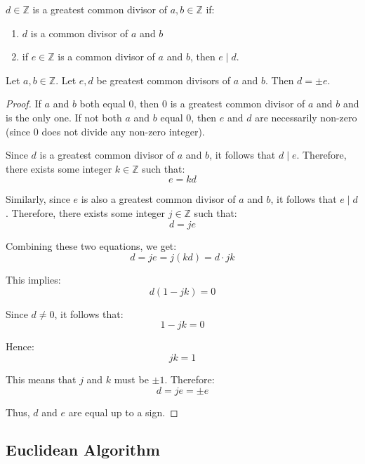 \documentclass[11pt]{article}
\begin{document}
\begin{definition}
    \(d \in \mathbb{Z}\) is a greatest common divisor of \(a, b \in \mathbb{Z}\) if:
    \begin{enumerate}
        \item \(d\) is a common divisor of \(a\) and \(b\)
        \item if \(e \in \mathbb{Z}\) is a common divisor of \(a\) and \(b\), then \(e \mid
              d\).
    \end{enumerate}
\end{definition}
\begin{lemma}
    Let \(a, b \in \mathbb{Z}\). Let \(e, d\) be greatest common divisors of \(a\) and \(b\). Then \(d = \pm e\).
\end{lemma}

\begin{proof}
    If \(a\) and \(b\) both equal \(0\), then \(0\) is a greatest common divisor of \(a\) and \(b\) and is the only one. If not both \(a\) and \(b\) equal \(0\), then \(e\) and \(d\) are necessarily non-zero (since \(0\) does not divide any non-zero integer).

    Since \(d\) is a greatest common divisor of \(a\) and \(b\), it follows that
    \(d \mid e\). Therefore, there exists some integer \(k \in \mathbb{Z}\) such
    that:
    \[ e = kd \]

    Similarly, since \(e\) is also a greatest common divisor of \(a\) and \(b\), it
    follows that \(e \mid d\). Therefore, there exists some integer \(j \in
    \mathbb{Z}\) such that:
    \[ d = je \]

    Combining these two equations, we get:
    \[ d = je = j(kd) = d \cdot jk \]

    This implies:
    \[ d(1 - jk) = 0 \]

    Since \(d \neq 0\), it follows that:
    \[ 1 - jk = 0 \]

    Hence:
    \[ jk = 1 \]

    This means that \(j\) and \(k\) must be \(\pm 1\). Therefore:
    \[ d = je = \pm e \]

    Thus, \(d\) and \(e\) are equal up to a sign.
\end{proof}
\subsection{Euclidean Algorithm}
\end{document}
